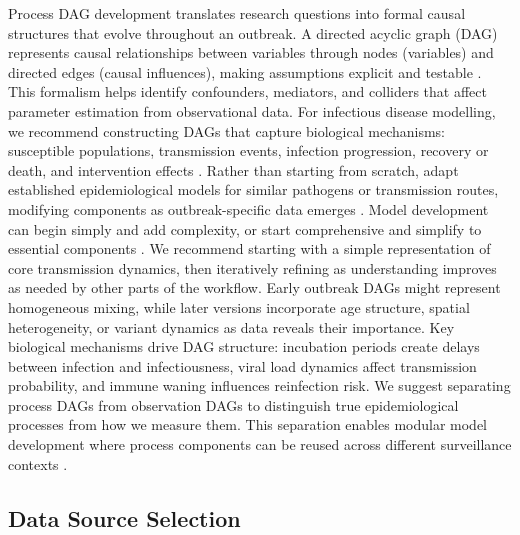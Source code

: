 \documentclass{article}
\begin{document}
Process DAG development translates research questions into formal causal structures that evolve throughout an outbreak.
A directed acyclic graph (DAG) represents causal relationships between variables through nodes (variables) and directed edges (causal influences), making assumptions explicit and testable \citep{digitale2022tutorial}.
This formalism helps identify confounders, mediators, and colliders that affect parameter estimation from observational data.
For infectious disease modelling, we recommend constructing DAGs that capture biological mechanisms: susceptible populations, transmission events, infection progression, recovery or death, and intervention effects \citep{deangelis2018analysing}.
Rather than starting from scratch, adapt established epidemiological models for similar pathogens or transmission routes, modifying components as outbreak-specific data emerges \citep{gelman2020bayesian}.
Model development can begin simply and add complexity, or start comprehensive and simplify to essential components \citep{gelman2020bayesian}.
We recommend starting with a simple representation of core transmission dynamics, then iteratively refining as understanding improves as needed by other parts of the workflow.
Early outbreak DAGs might represent homogeneous mixing, while later versions incorporate age structure, spatial heterogeneity, or variant dynamics as data reveals their importance.
Key biological mechanisms drive DAG structure: incubation periods create delays between infection and infectiousness, viral load dynamics affect transmission probability, and immune waning influences reinfection risk.
We suggest separating process DAGs from observation DAGs to distinguish true epidemiological processes from how we measure them.
This separation enables modular model development where process components can be reused across different surveillance contexts \citep{nicholson2022interoperability}.

\subsection{Data Source Selection}
\end{document}
